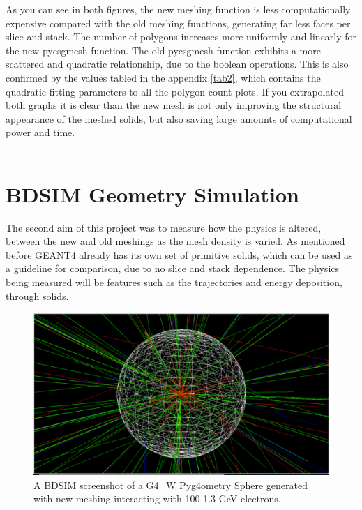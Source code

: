 \documentclass[12pt,a4paper]{article}
\begin{document}
\newpage
\noindent As you can see in both figures, the new meshing function is less computationally expensive compared with the old meshing functions, generating far less faces per slice and stack. The number of polygons increases more uniformly and linearly for the new pycsgmesh function. The old pycsgmesh function exhibits a more scattered and quadratic relationship, due to the boolean operations. This is also confirmed by the values tabled in the appendix \ref{tab2}, which contains the quadratic fitting parameters to all the polygon count plots. If you extrapolated both graphs it is clear than the new mesh is not only improving the structural appearance of the meshed solids, but also saving large amounts of computational power and time.
\\\label{recur}\\


\section{BDSIM Geometry Simulation}
\label{int}
The second aim of this project was to measure how the physics is altered, between the new and old meshings as the mesh density is varied. As mentioned before GEANT4 already has its own set of primitive solids, which can be used as a guideline for comparison, due to no slice and stack dependence. The physics being measured will be features such as the trajectories and energy deposition, through solids.

\begin{figure}[h!]
\centering
\includegraphics[scale=0.33]{Images//BDSIM//titanium.pdf}
\caption[width=\columnwidth]{A BDSIM screenshot of a G4\_W Pyg4ometry Sphere generated with new meshing interacting with 100 1.3 GeV electrons.}
\label{black}
\end{figure}
\end{document}
